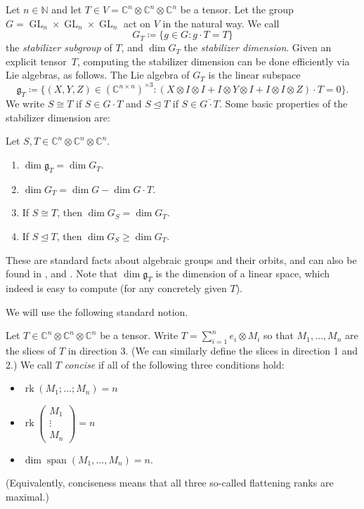 \documentclass[11pt,a4paper]{article}
\numberwithin{equation}{section}
\newcommand{\degenleq}{\unlhd}
\newcommand{\CC}{\mathbb{C}}
\newcommand{\NN}{\mathbb{N}}
\DeclareMathOperator{\GL}{GL}
\DeclareMathOperator{\linspan}{span}
\DeclareMathOperator{\rk}{rk}
\begin{document}
Let $n \in \NN$ and 
let $T \in V = \CC^n \otimes \CC^n \otimes \CC^n$ be a tensor. Let the group $G = \GL_n \times \GL_n \times \GL_n$ act on $V$ in the natural way. 
We call
\[
G_T \coloneqq \{g \in G : g\cdot T = T\}
\]
the \emph{stabilizer subgroup} of $T$, and $\dim G_T$ the \emph{stabilizer dimension}.  Given an explicit tensor~$T$, computing the stabilizer dimension can be done efficiently via Lie algebras, as follows.
%
The Lie algebra of $G_T$ \cite[II.2.5, Folgerung~3]{MR768181} is the linear subspace
\[
\mathfrak{g}_T \coloneqq \{ (X,Y,Z) \in (\CC^{n \times n})^{\times 3} : (X \otimes I \otimes I + I \otimes Y \otimes I + I \otimes I \otimes Z)\cdot T = 0 \}.
\]
%
%
%
%
We write $S \cong T$ if $S \in G\cdot T$ and $S \degenleq T$ if $S \in \overline{G \cdot T}$.
Some basic properties of the stabilizer dimension are:
\begin{lemma} Let $S,T \in \CC^n \otimes \CC^n \otimes \CC^n$.
\begin{enumerate}[\upshape (1)]
\item $\dim \mathfrak{g}_T = \dim G_T$.
\item $\dim G_T = \dim G - \dim G\cdot T$. 
\item If $S \cong T$, then $\dim G_S = \dim G_T$.
\item If $S \degenleq T$, then $\dim G_S \geq \dim G_T$. 
\end{enumerate}
\end{lemma}

%
These are standard facts about algebraic groups and their orbits, and can also be found in \cite[\S4.3, \S8.3, \S9.1]{MR396773}, \cite[II.2.2, II.2.5]{MR768181} and \cite[Ch.~1, \S2]{MR1064110}. Note that $\dim \mathfrak{g}_T$ is the dimension of a linear space, which indeed is easy to compute (for any concretely given $T$).
%

We will use the following standard notion.

\begin{definition}
	Let $T \in \CC^n \otimes \CC^n \otimes \CC^n$ be a tensor. Write $T = \sum_{i=1}^n e_i \otimes M_i$ so that $M_1,\dots,M_n$ are the slices of $T$ in direction $3$. (We can similarly define the slices in direction 1 and 2.) We call $T$ \emph{concise} if all of the following three conditions hold:
	\begin{itemize}
		\item[(1)] {$\rk (M_1; \dots ; M_n)=n$}
		\item[(2)] {$\rk \begin{pmatrix}
				M_1\\
				\vdots \\
				M_n
			\end{pmatrix}=n$}
		\item[(3)] {$\dim \linspan (M_1,\dots,M_n)=n$.}
	\end{itemize}
(Equivalently, conciseness means that all three so-called flattening ranks are maximal.)
\end{definition}
%
\end{document}
